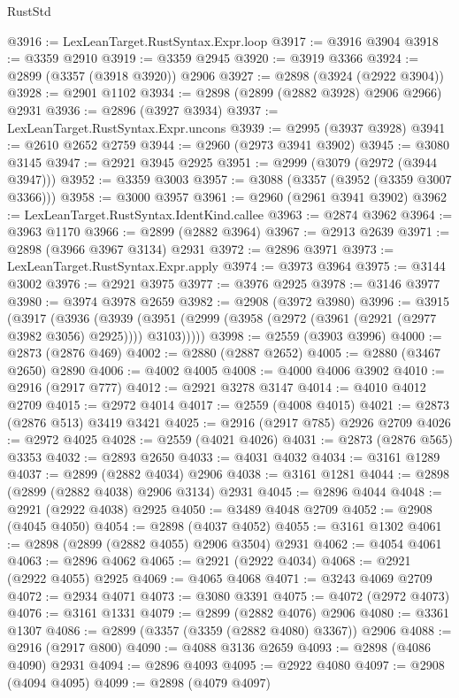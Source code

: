 \begin{lexlean}{RustStd}
\begin{coremodule}
@3916 := LexLeanTarget.RustSyntax.Expr.loop
@3917 := @3916 @3904
@3918 := @3359 @2910
@3919 := @3359 @2945
@3920 := @3919 @3366
@3924 := @2899 (@3357 (@3918 @3920)) @2906
@3927 := @2898 (@3924 (@2922 @3904))
@3928 := @2901 @1102
@3934 := @2898 (@2899 (@2882 @3928) @2906 @2966) @2931
@3936 := @2896 (@3927 @3934)
@3937 := LexLeanTarget.RustSyntax.Expr.uncons
@3939 := @2995 (@3937 @3928)
@3941 := @2610 @2652 @2759
@3944 := @2960 (@2973 @3941 @3902)
@3945 := @3080 @3145
@3947 := @2921 @3945 @2925
@3951 := @2999 (@3079 (@2972 (@3944 @3947)))
@3952 := @3359 @3003
@3957 := @3088 (@3357 (@3952 (@3359 @3007 @3366)))
@3958 := @3000 @3957
@3961 := @2960 (@2961 @3941 @3902)
@3962 := LexLeanTarget.RustSyntax.IdentKind.callee
@3963 := @2874 @3962
@3964 := @3963 @1170
@3966 := @2899 (@2882 @3964)
@3967 := @2913 @2639
@3971 := @2898 (@3966 @3967 @3134) @2931
@3972 := @2896 @3971
@3973 := LexLeanTarget.RustSyntax.Expr.apply
@3974 := @3973 @3964
@3975 := @3144 @3002
@3976 := @2921 @3975
@3977 := @3976 @2925
@3978 := @3146 @3977
@3980 := @3974 @3978 @2659
@3982 := @2908 (@3972 @3980)
@3996 := @3915
    (@3917
      (@3936
        (@3939 (@3951 (@2999 (@3958 (@2972 (@3961 (@2921 (@2977 @3982 @3056) @2925)))) @3103)))))
@3998 := @2559 (@3903 @3996)
@4000 := @2873 (@2876 @469)
@4002 := @2880 (@2887 @2652)
@4005 := @2880 (@3467 @2650) @2890
@4006 := @4002 @4005
@4008 := @4000 @4006 @3902
@4010 := @2916 (@2917 @777)
@4012 := @2921 @3278 @3147
@4014 := @4010 @4012 @2709
@4015 := @2972 @4014
@4017 := @2559 (@4008 @4015)
@4021 := @2873 (@2876 @513) @3419 @3421
@4025 := @2916 (@2917 @785) @2926 @2709
@4026 := @2972 @4025
@4028 := @2559 (@4021 @4026)
@4031 := @2873 (@2876 @565) @3353
@4032 := @2893 @2650
@4033 := @4031 @4032
@4034 := @3161 @1289
@4037 := @2899 (@2882 @4034) @2906
@4038 := @3161 @1281
@4044 := @2898 (@2899 (@2882 @4038) @2906 @3134) @2931
@4045 := @2896 @4044
@4048 := @2921 (@2922 @4038) @2925
@4050 := @3489 @4048 @2709
@4052 := @2908 (@4045 @4050)
@4054 := @2898 (@4037 @4052)
@4055 := @3161 @1302
@4061 := @2898 (@2899 (@2882 @4055) @2906 @3504) @2931
@4062 := @4054 @4061
@4063 := @2896 @4062
@4065 := @2921 (@2922 @4034)
@4068 := @2921 (@2922 @4055) @2925
@4069 := @4065 @4068
@4071 := @3243 @4069 @2709
@4072 := @2934 @4071
@4073 := @3080 @3391
@4075 := @4072 (@2972 @4073)
@4076 := @3161 @1331
@4079 := @2899 (@2882 @4076) @2906
@4080 := @3361 @1307
@4086 := @2899 (@3357 (@3359 (@2882 @4080) @3367)) @2906
@4088 := @2916 (@2917 @800)
@4090 := @4088 @3136 @2659
@4093 := @2898 (@4086 @4090) @2931
@4094 := @2896 @4093
@4095 := @2922 @4080
@4097 := @2908 (@4094 @4095)
@4099 := @2898 (@4079 @4097)

\end{coremodule}
\end{lexlean}
